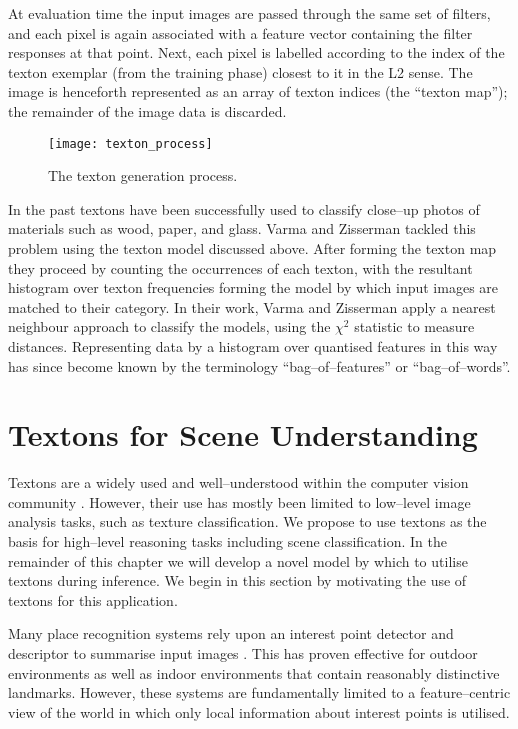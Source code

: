 At evaluation time the input images are passed through the same set of
filters, and each pixel is again associated with a feature vector
containing the filter responses at that point. Next, each pixel is
labelled according to the index of the texton exemplar (from the
training phase) closest to it in the L2 sense. The image is
henceforth represented as an array of texton indices (the ``texton
map''); the remainder of the image data is discarded.

\begin{figure}[htp]
  \centering
  \texttt{[image: texton\_process]}
  \caption{The texton generation process.}
  \label{fig:texton-process}
\end{figure}

In the past textons have been successfully used to classify close--up
photos of materials such as wood, paper, and glass. Varma and
Zisserman \cite{Varma05} tackled this problem using the texton model
discussed above. After forming the texton map they proceed by counting
the occurrences of each texton, with the resultant histogram over
texton frequencies forming the model by which input images are matched
to their category. In their work, Varma and Zisserman apply a nearest
neighbour approach to classify the models, using the $\chi^2$
statistic to measure distances. Representing data by a histogram over
quantised features in this way has since become known by the
terminology ``bag--of--features'' or ``bag--of--words''.

\section{Textons for Scene Understanding}
Textons are a widely used and well--understood within the computer
vision community \cite{Zhu02,Varma05,Malik99}. However, their use has
mostly been limited to low--level image analysis tasks, such as
texture classification. We propose to use textons as the basis for
high--level reasoning tasks including scene classification. In the
remainder of this chapter we will develop a novel model by which to
utilise textons during inference. We begin in this section by
motivating the use of textons for this application.

Many place recognition systems rely upon an interest point detector
and descriptor to summarise input images
\cite{Fei-fei05,Cummins08}. This has proven effective for outdoor
environments as well as indoor environments that contain reasonably
distinctive landmarks. However, these systems are fundamentally
limited to a feature--centric view of the world in which only local
information about interest points is utilised.

